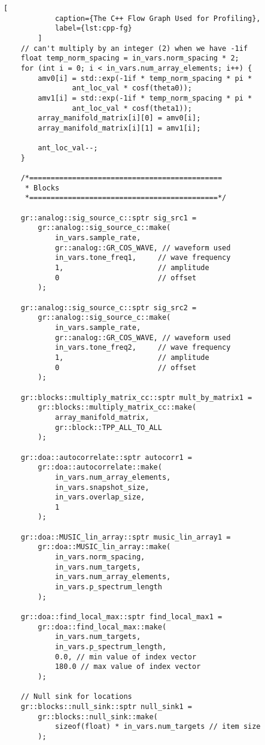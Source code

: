 \begin{lstlisting}[
		    caption={The C++ Flow Graph Used for Profiling},
		    label={lst:cpp-fg}
		]
    // can't multiply by an integer (2) when we have -1if
    float temp_norm_spacing = in_vars.norm_spacing * 2;
    for (int i = 0; i < in_vars.num_array_elements; i++) {
        amv0[i] = std::exp(-1if * temp_norm_spacing * pi * 
			    ant_loc_val * cosf(theta0));
        amv1[i] = std::exp(-1if * temp_norm_spacing * pi *
			    ant_loc_val * cosf(theta1));
        array_manifold_matrix[i][0] = amv0[i];
        array_manifold_matrix[i][1] = amv1[i];

        ant_loc_val--;
    }
    
    /*=============================================
     * Blocks
     *============================================*/
    
    gr::analog::sig_source_c::sptr sig_src1 = 
        gr::analog::sig_source_c::make(
            in_vars.sample_rate,
            gr::analog::GR_COS_WAVE, // waveform used
            in_vars.tone_freq1,     // wave frequency
            1,                      // amplitude
            0                       // offset
        );
    
    gr::analog::sig_source_c::sptr sig_src2 = 
        gr::analog::sig_source_c::make(
            in_vars.sample_rate,
            gr::analog::GR_COS_WAVE, // waveform used
            in_vars.tone_freq2,     // wave frequency
            1,                      // amplitude
            0                       // offset
        );

    gr::blocks::multiply_matrix_cc::sptr mult_by_matrix1 = 
        gr::blocks::multiply_matrix_cc::make(
            array_manifold_matrix,
            gr::block::TPP_ALL_TO_ALL
        );

    gr::doa::autocorrelate::sptr autocorr1 = 
        gr::doa::autocorrelate::make(
            in_vars.num_array_elements,
            in_vars.snapshot_size,
            in_vars.overlap_size,
            1 
        );
    
    gr::doa::MUSIC_lin_array::sptr music_lin_array1 =
        gr::doa::MUSIC_lin_array::make(
            in_vars.norm_spacing,
            in_vars.num_targets,
            in_vars.num_array_elements,
            in_vars.p_spectrum_length
        );

    gr::doa::find_local_max::sptr find_local_max1 = 
        gr::doa::find_local_max::make(
            in_vars.num_targets,
            in_vars.p_spectrum_length,
            0.0, // min value of index vector
            180.0 // max value of index vector
        );

    // Null sink for locations
    gr::blocks::null_sink::sptr null_sink1 = 
        gr::blocks::null_sink::make(
            sizeof(float) * in_vars.num_targets // item size
        );


\end{lstlisting}
